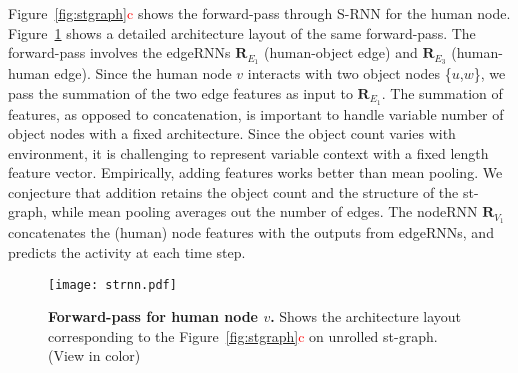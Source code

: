 \documentclass[10pt,twocolumn,letterpaper]{article}
\newcommand{\ve}[1]{\mathbf{#1}}
\newcommand{\rc}[1]{\textcolor{red}{#1}}
\begin{document}
Figure~\ref{fig:stgraph}\rc{c} shows the forward-pass through S-RNN for the human node. Figure~\ref{fig:strnn} shows a detailed architecture layout of the same forward-pass. The forward-pass involves the edgeRNNs $\ve{R}_{E_1}$ (human-object edge) and $\ve{R}_{E_3}$ (human-human edge). Since the human node $v$ interacts with two object nodes \{$u$,$w$\},
we pass the summation of the two edge features as input to $\ve{R}_{E_1}$. The summation of features, as opposed to concatenation, is important to handle {variable number} of object nodes with a {fixed architecture}. Since the object count varies with environment, it is challenging to represent variable context with a fixed length feature vector. Empirically, adding features works better than mean pooling. We conjecture that addition retains the object count and the structure of the st-graph, while mean pooling averages out the number of edges.  The nodeRNN $\ve{R}_{V_1}$ concatenates the (human) node features with the outputs from edgeRNNs, and predicts the activity at each time step. 
\begin{figure}[t]
	\centering
	\texttt{[image: strnn.pdf]}
	\vspace{1.5\sectionReduceTop}
	\caption{\footnotesize{\textbf{Forward-pass for human node $v$.} Shows the architecture layout corresponding to the Figure~\ref{fig:stgraph}\rc{c} on unrolled st-graph. (View in color)}}
	\label{fig:strnn}
	\vspace{2\sectionReduceBot}
\end{figure}%
\end{document}
